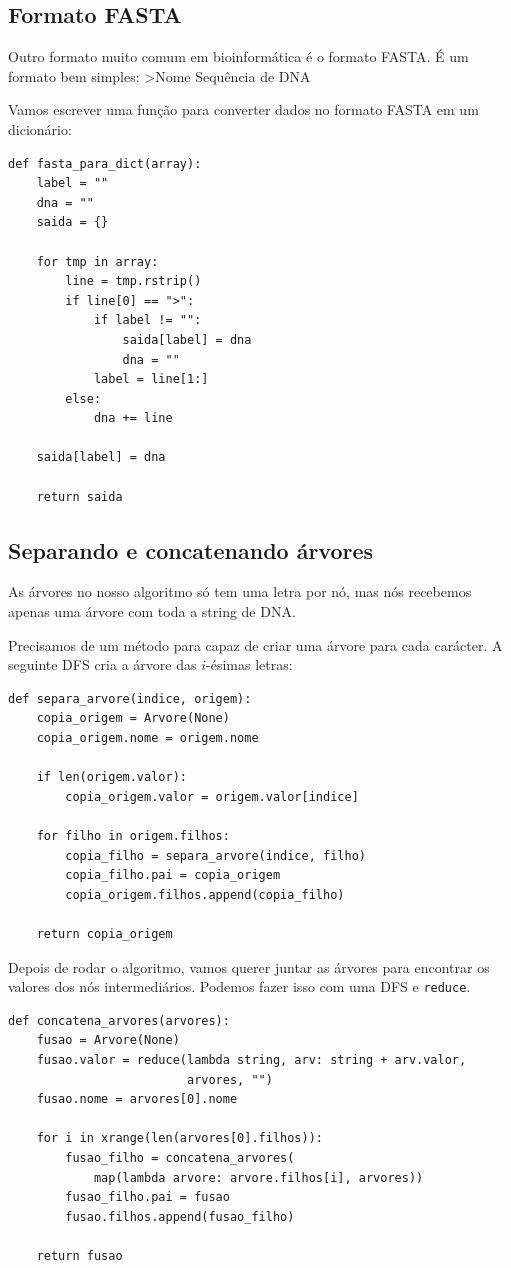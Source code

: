 \documentclass[11pt]{article}
\begin{document}
\subsection{Formato FASTA}
\label{sec-3-2}

Outro formato muito comum em bioinformática é o formato FASTA. É um
formato bem simples:
>Nome
Sequência de DNA

Vamos escrever uma função para converter dados no formato FASTA em um
dicionário:
\begin{verbatim}
def fasta_para_dict(array):
    label = ""
    dna = ""
    saida = {}

    for tmp in array:
        line = tmp.rstrip()
        if line[0] == ">":
            if label != "":
                saida[label] = dna
                dna = ""
            label = line[1:]
        else:
            dna += line

    saida[label] = dna

    return saida
\end{verbatim}

\subsection{Separando e concatenando árvores}
\label{sec-3-3}

As árvores no nosso algoritmo só tem uma letra por nó, mas nós
recebemos apenas uma árvore com toda a string de DNA.

Precisamos de um método para capaz de criar uma árvore para cada
carácter. A seguinte DFS cria a árvore das $i$-ésimas letras:
\begin{verbatim}
def separa_arvore(indice, origem):
    copia_origem = Arvore(None)
    copia_origem.nome = origem.nome

    if len(origem.valor):
        copia_origem.valor = origem.valor[indice]

    for filho in origem.filhos:
        copia_filho = separa_arvore(indice, filho)
        copia_filho.pai = copia_origem
        copia_origem.filhos.append(copia_filho)

    return copia_origem
\end{verbatim}


Depois de rodar o algoritmo, vamos querer juntar as árvores para encontrar
os valores dos nós intermediários. Podemos fazer isso com uma DFS e \verb~reduce~.
\begin{verbatim}
def concatena_arvores(arvores):
    fusao = Arvore(None)
    fusao.valor = reduce(lambda string, arv: string + arv.valor,
                         arvores, "")
    fusao.nome = arvores[0].nome

    for i in xrange(len(arvores[0].filhos)):
        fusao_filho = concatena_arvores(
            map(lambda arvore: arvore.filhos[i], arvores))
        fusao_filho.pai = fusao
        fusao.filhos.append(fusao_filho)

    return fusao
\end{verbatim}
\end{document}
